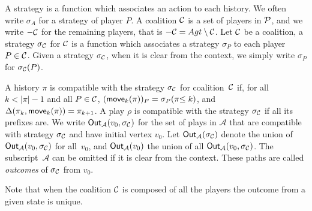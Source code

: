 \begin{definition}
  A strategy is a function which associates an action to each history.
  We often write $\sigma_A$ for a strategy of player $P$.
  A coalition $\mathcal{C}$ is a set of players in $\mathcal{P}$, and we write
  $-\mathcal{C}$ for the remaining players, that is $-\mathcal{C} = Agt \setminus \mathcal{C}$.
  Let \(\mathcal{C}\) be a coalition, a strategy \(\sigma_{\mathcal{C}}\) for \(\mathcal{C}\) is a function
  which associates a strategy \(\sigma_P\) to each player \(P\in \mathcal{C}\).
  Given a strategy $\sigma_{\mathcal{C}}$, when it is clear from the context, we simply
  write \(\sigma_P\) for \(\sigma_{\mathcal{C}}(P)\).
\end{definition}

\begin{definition}[Outcomes]
  A history \(\pi\) is compatible
  with the strategy \(\sigma_{\mathcal{C}}\) for coalition~$\mathcal{C}$ if, for all \(k < |\pi| - 1\) and all
  \(P \in \mathcal{C}\), \((\textsf{move}_k(\pi))_P = \sigma_P(\pi{\le k})\), and
  \(\Delta(\pi_k, \textsf{move}_k(\pi)) = \pi_{k+1}\). A play \(\rho\) is compatible with
  the strategy \(\sigma_{\mathcal{C}}\) if all its prefixes are. We write
  \(\textsf{Out}_{\mathcal{A}}(v_0, \sigma_{\mathcal{C}})\) for the set of plays in \(\mathcal{A}\) that
  are compatible with strategy \(\sigma_{\mathcal{C}}\) and have initial vertex
  \(v_0\). Let \(\textsf{Out}_{\mathcal{A}}(\sigma_{\mathcal{C}})\) denote the union
  of \(\textsf{Out}_{\mathcal{A}}(v_0, \sigma_{\mathcal{C}})\) for all~$v_0$,
  and \(\textsf{Out}_{\mathcal{A}}(v_0)\) the union of all \(\textsf{Out}_{\mathcal{A}}(v_0, \sigma_{\mathcal{C}})\).
  The subscript~$\mathcal{A}$ can be omitted if it is clear from the context.
  These paths are called \emph{outcomes} of \(\sigma_{\mathcal{C}}\) from
  \(v_0\). 
\end{definition}
Note that
when the coalition \(\mathcal{C}\) is composed of all the players
the outcome from a given state is unique.

